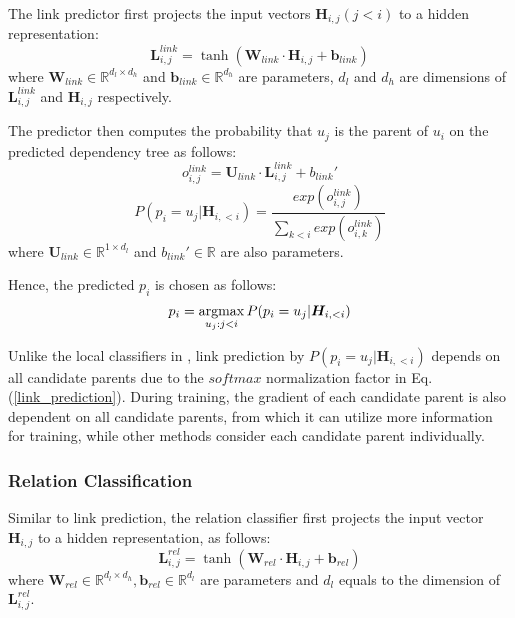 \documentclass[letterpaper]{article} \usepackage{aaai19}  \usepackage{times}  \usepackage{helvet}  \usepackage{courier}  \usepackage{url}  \usepackage{graphicx}  \usepackage{amssymb}
\begin{document}
The link predictor first projects the input vectors $\bm{H}_{i,j}(j<i)$ to a hidden representation:
\begin{equation}
    \bm{L}_{i,j}^{link}=\tanh (\bm{W}_{link} \cdot \bm{H}_{i,j} + \bm{b}_{link} )
    \label{eq-link-prec}
\end{equation}
where $\bm{W}_{link}\in \mathbb{R}^{d_l\times d_h}$ and $\bm{b}_{link}\in \mathbb{R}^{d_h}$ are parameters, $d_l$ and $d_h$ are dimensions of $\bm{L}_{i,j}^{link}$ and $\bm{H}_{i,j}$ respectively.

The predictor then computes the probability that $u_j$ is the parent of $u_i$ on the predicted dependency tree as follows:
\begin{equation}
    o_{i,j}^{link}=\bm{U}_{link}\cdot \bm{L}_{i,j}^{link} + b_{link}' 
\end{equation}
\begin{equation}
    P(p_i=u_j|\bm{H}_{i,<i})=\frac{exp(o_{i,j}^{link})}{\sum_{k<i} exp(o_{i,k}^{link})}
    \label{link_prediction}
\end{equation}
where $\bm{U}_{link}\in\mathbb{R}^{1\times d_l}$ and $b_{link}'\in\mathbb{R}$ are also parameters.

Hence, the predicted $p_i$ is chosen as follows:
\begin{equation}
    p_i=\mathop{\rm argmax}_{u_j:j<i} P(p_i=u_j|\bm{H}_{i,<i}) 
\end{equation}

Unlike the local classifiers in \cite{li2014text,afantenos2015discourse,perret2016integer}, link prediction by $P(p_i=u_j|\bm{H}_{i,<i})$ depends on all candidate parents due to the $softmax$ normalization factor in Eq. (\ref{link_prediction}). 
During training, the gradient of each candidate parent is also dependent on all candidate parents, from which it can utilize more information for training, while other methods consider each candidate parent individually.

\subsubsection{Relation Classification}

Similar to link prediction, the relation classifier first projects the input vector $\bm{H}_{i,j}$ to a hidden representation, as follows:
\begin{equation}
    \bm{L}_{i,j}^{rel}=\tanh (\bm{W}_{rel} \cdot \bm{H}_{i,j} + \bm{b}_{rel} )
    \label{eq-rel-class}
\end{equation}  
where $\bm{W}_{rel}\in \mathbb{R}^{d_l\times d_h},\bm{b}_{rel}\in \mathbb{R}^{d_l}$ are parameters and $d_l$ equals to the  dimension of $\bm{L}_{i,j}^{rel}$.
\end{document}
